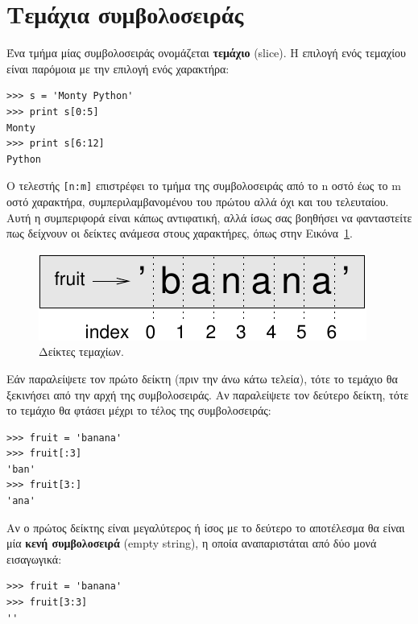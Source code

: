 \documentclass[10pt]{book}
\begin{document}
\section{Τεμάχια συμβολοσειράς}
\label{slice}

Ένα τμήμα μίας συμβολοσειράς ονομάζεται {\bf τεμάχιο} (slice). Η επιλογή ενός
τεμαχίου είναι παρόμοια με την επιλογή ενός χαρακτήρα:

\begin{verbatim}
>>> s = 'Monty Python'
>>> print s[0:5]
Monty
>>> print s[6:12]
Python
\end{verbatim}
%

Ο τελεστής {\tt [n:m]} επιστρέφει το τμήμα της συμβολοσειράς από το
n οστό έως το m οστό χαρακτήρα, συμπεριλαμβανομένου του πρώτου αλλά όχι και
του τελευταίου. Αυτή η συμπεριφορά είναι κάπως αντιφατική, αλλά ίσως σας βοηθήσει να φανταστείτε πως δείχνουν οι δείκτες ανάμεσα στους χαρακτήρες, όπως στην Εικόνα~\ref{fig.banana}.

\begin{figure}
\centerline
{\includegraphics[scale=0.8]{figs/banana.pdf}}
\caption{Δείκτες τεμαχίων.}
\label{fig.banana}
\end{figure}


Εάν παραλείψετε τον πρώτο δείκτη (πριν την άνω κάτω τελεία), τότε το τεμάχιο θα ξεκινήσει από την αρχή της συμβολοσειράς. Αν παραλείψετε τον δεύτερο δείκτη, τότε το τεμάχιο θα φτάσει μέχρι το τέλος της συμβολοσειράς:

\begin{verbatim}
>>> fruit = 'banana'
>>> fruit[:3]
'ban'
>>> fruit[3:]
'ana'
\end{verbatim}
%

Αν ο πρώτος δείκτης είναι μεγαλύτερος ή ίσος με το δεύτερο το αποτέλεσμα θα είναι μία {\bf κενή συμβολοσειρά} (empty string), η οποία αναπαριστάται από δύο μονά εισαγωγικά:

\begin{verbatim}
>>> fruit = 'banana'
>>> fruit[3:3]
''
\end{verbatim}
%
\end{document}
